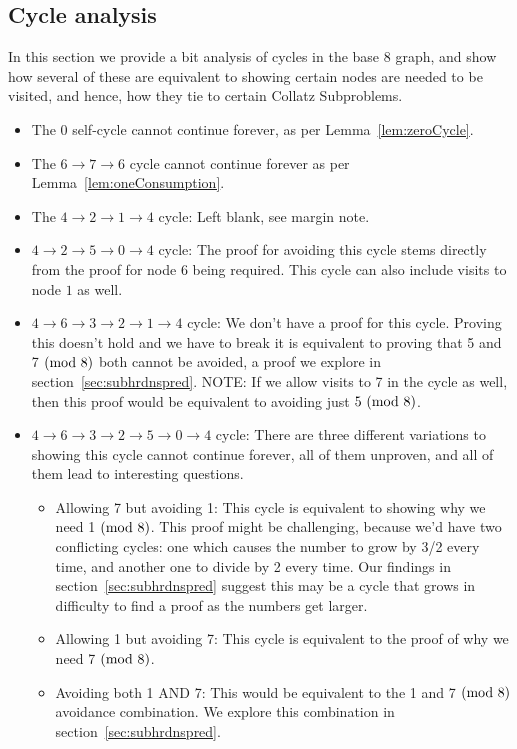 \subsection{Cycle analysis} \label{subsubsec:cycleanalysis}
In this section we provide a bit analysis of cycles in the base 8 graph, and show how several of these are equivalent to showing certain nodes are needed to be visited, and hence, how they tie to certain Collatz Subproblems.
\begin{itemize}
    \item The 0 self-cycle cannot continue forever, as per Lemma~\ref{lem:zeroCycle}.
    \item The $6 \rightarrow 7 \rightarrow 6$ cycle cannot continue forever as per Lemma~\ref{lem:oneConsumption}.
    \item The $4 \rightarrow 2 \rightarrow 1 \rightarrow 4$ cycle: Left blank, see margin note. 
    \item $4 \rightarrow 2 \rightarrow 5 \rightarrow 0 \rightarrow 4$ cycle: The proof for avoiding this cycle stems directly from the proof for node $6$ being required. This cycle can also include visits to node $1$ as well.
    \item $4 \rightarrow 6 \rightarrow 3 \rightarrow 2 \rightarrow 1 \rightarrow 4$ cycle: We don't have a proof for this cycle. Proving this doesn't hold and we have to break it is equivalent to proving that 5 and 7$\ (\mathrm{mod}\ 8)$ both cannot be avoided, a proof we explore in section~\ref{sec:subhrdnspred}. NOTE: If we allow visits to 7 in the cycle as well, then this proof would be equivalent to avoiding just $5 \ (\mathrm{mod}\ 8)$.
    \item $4 \rightarrow 6 \rightarrow 3 \rightarrow 2 \rightarrow 5 \rightarrow 0 \rightarrow 4$ cycle: There are three different variations to showing this cycle cannot continue forever, all of them unproven, and all of them lead to interesting questions.
    \begin{itemize}
        \item Allowing 7 but avoiding 1: This cycle is equivalent to showing why we need 1$\ (\mathrm{mod}\ 8)$. This proof might be challenging, because we'd have two conflicting cycles: one which causes the number to grow by 3/2 every time, and another one to divide by 2 every time. Our findings in section~\ref{sec:subhrdnspred} suggest this may be a cycle that grows in difficulty to find a proof as the numbers get larger.
        \item Allowing 1 but avoiding 7: This cycle is equivalent to the proof of why we need 7$\ (\mathrm{mod}\ 8)$. 
        \item Avoiding both 1 AND 7: This would be equivalent to the 1 and 7$\ (\mathrm{mod}\ 8)$ avoidance combination. We explore this combination in section~\ref{sec:subhrdnspred}.
    \end{itemize}
\end{itemize}